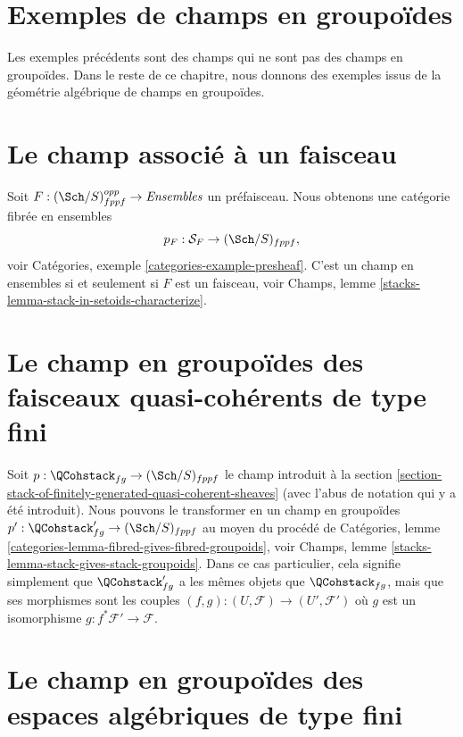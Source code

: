 \section{Exemples de champs en groupoïdes}
\label{section-examples-stacks-in-groupoids}

\noindent
Les exemples précédents sont des champs qui ne sont pas des champs en
groupoïdes. Dans le reste de ce chapitre, nous donnons
des exemples issus de la géométrie algébrique de champs en groupoïdes.



\section{Le champ associé à un faisceau}
\label{section-stack-associated-to-sheaf}

\noindent
Soit $F : (\Sch/S)_{fppf}^{opp} \to \textit{Ensembles}$ un préfaisceau.
Nous obtenons une catégorie fibrée en ensembles
$$
p_F : \mathcal{S}_F \to (\Sch/S)_{fppf},
$$
voir
Catégories, exemple \ref{categories-example-presheaf}.
C'est un champ en ensembles si et seulement si $F$ est un faisceau, voir
Champs, lemme \ref{stacks-lemma-stack-in-setoids-characterize}.



\section{Le champ en groupoïdes des faisceaux quasi-cohérents de type fini}
\label{section-stack-in-groupoids-of-quasi-coherent-sheaves}

\noindent
Soit $p : \QCohstack_{fg} \to (\Sch/S)_{fppf}$ le champ
introduit à la
section \ref{section-stack-of-finitely-generated-quasi-coherent-sheaves}
(avec l'abus de notation qui y a été introduit).
Nous pouvons le transformer en un champ en groupoïdes
$p' : \QCohstack_{fg}' \to (\Sch/S)_{fppf}$ au moyen
du procédé de
Catégories, lemme \ref{categories-lemma-fibred-gives-fibred-groupoids},
voir
Champs, lemme \ref{stacks-lemma-stack-gives-stack-groupoids}.
Dans ce cas particulier, cela signifie simplement que $\QCohstack_{fg}'$ a
les mêmes objets que $\QCohstack_{fg}$, mais que ses morphismes sont les
couples $(f, g) : (U, \mathcal{F}) \to (U', \mathcal{F}')$
où $g$ est un isomorphisme $g : f^*\mathcal{F}' \to \mathcal{F}$.


\section{Le champ en groupoïdes des espaces algébriques de type fini}
\label{section-stack-in-groupoids-of-finite-type-spaces}

